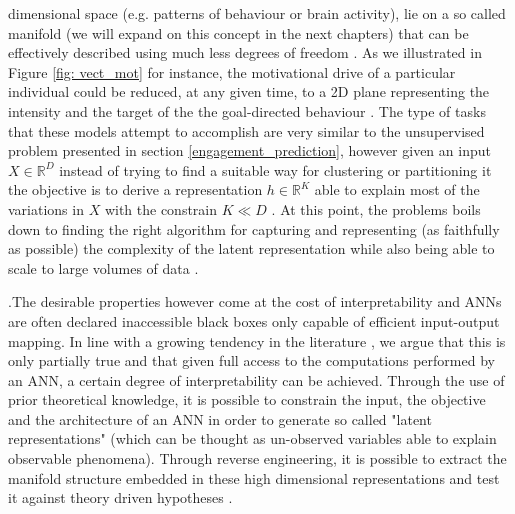 dimensional space (e.g. patterns of behaviour or brain activity), lie on a so called manifold (we will expand on this concept in the next chapters) that can be effectively described using much less degrees of freedom \cite{seung2000manifold, pang2016dimensionality, luxem2020identifying}. As we illustrated in Figure \ref{fig: vect_mot} for instance, the motivational drive of a particular individual could be reduced, at any given time, to a 2D plane representing the intensity and the target of the the goal-directed behaviour \cite{simpson2016behavioral}. The type of tasks that these models attempt to accomplish are very similar to the unsupervised problem presented in section \ref{engagement_prediction}, however given an input $X \in \mathbb{R}^{D}$ instead of trying to find a suitable way for clustering or partitioning it the objective is to derive a representation $h \in \mathbb{R}^{K}$ able to explain most of the variations in $X$ with the constrain $K \ll D$ \cite{bishop2006pattern,murphy2022probabilistic}. At this point, the problems boils down to finding the right algorithm for capturing and representing (as faithfully as possible) the complexity of the latent representation \cite{eyjolfsdottir2016learning,schuster2007introduction} while also being able to scale to large volumes of data \cite{touloupou2020scalable}. 


.The desirable properties however come at the cost of interpretability and ANNs are often declared inaccessible black boxes only capable of  efficient input-output mapping. In line with a growing tendency in the literature \cite{barak2017recurrent,kietzmann2018deep, luxem2020identifying, pereira2020quantifying, mccullough2021unsupervised, shi2021learning}, we argue that this is only partially true and that given full access to the computations performed by an ANN, a certain degree of interpretability can be achieved. Through the use of prior theoretical knowledge, it is possible to constrain the input, the objective and the architecture of an ANN in order to generate so called "latent representations" (which can be thought as un-observed variables able to explain observable phenomena). Through reverse engineering, it is possible to extract the manifold structure embedded in these high dimensional representations and test it against theory driven hypotheses \cite{barak2017recurrent,kietzmann2018deep}. 

